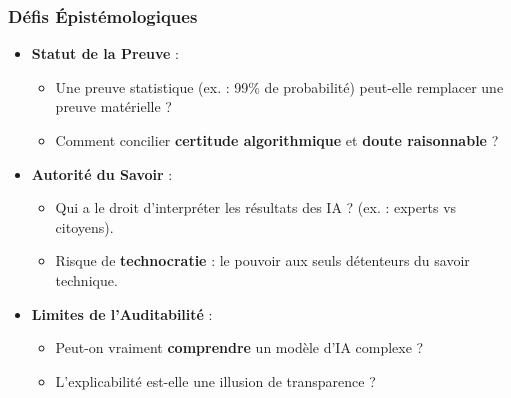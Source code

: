 \documentclass[a4paper,12pt]{report}
\begin{document}
	\subsubsection{Défis Épistémologiques}
	\begin{itemize}
		\item \textbf{Statut de la Preuve} :
		\begin{itemize}
			\item Une preuve statistique (ex. : 99\% de probabilité) peut-elle remplacer une preuve matérielle ?
			\item Comment concilier \textbf{certitude algorithmique} et \textbf{doute raisonnable} ?
		\end{itemize}
		\item \textbf{Autorité du Savoir} :
		\begin{itemize}
			\item Qui a le droit d’interpréter les résultats des IA ? (ex. : experts vs citoyens).
			\item Risque de \textbf{technocratie} : le pouvoir aux seuls détenteurs du savoir technique.
		\end{itemize}
		\item \textbf{Limites de l’Auditabilité} :
		\begin{itemize}
			\item Peut-on vraiment \textbf{comprendre} un modèle d’IA complexe ?
			\item L’explicabilité est-elle une illusion de transparence ?
		\end{itemize}
	\end{itemize}
	
\end{document}
